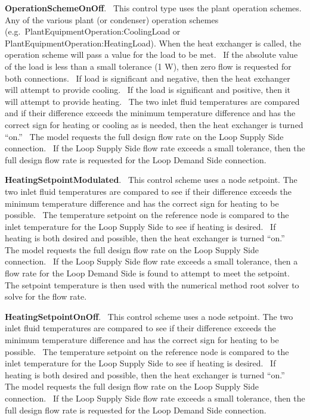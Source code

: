 \textbf{OperationSchemeOnOff}.~ This control type uses the plant operation schemes. Any of the various plant (or condenser) operation schemes (e.g.~PlantEquipmentOperation:CoolingLoad or PlantEquipmentOperation:HeatingLoad). When the heat exchanger is called, the operation scheme will pass a value for the load to be met.~ If the absolute value of the load is less than a small tolerance (1 W), then zero flow is requested for both connections.~ If load is significant and negative, then the heat exchanger will attempt to provide cooling.~ If the load is significant and positive, then it will attempt to provide heating.~ The two inlet fluid temperatures are compared and if their difference exceeds the minimum temperature difference and has the correct sign for heating or cooling as is needed, then the heat exchanger is turned ``on.''~ The model requests the full design flow rate on the Loop Supply Side connection.~ If the Loop Supply Side flow rate exceeds a small tolerance, then the full design flow rate is requested for the Loop Demand Side connection.

\textbf{HeatingSetpointModulated}.~ This control scheme uses a node setpoint. The two inlet fluid temperatures are compared to see if their difference exceeds the minimum temperature difference and has the correct sign for heating to be possible.~ The temperature setpoint on the reference node is compared to the inlet temperature for the Loop Supply Side to see if heating is desired.~ If heating is both desired and possible, then the heat exchanger is turned ``on.''~ The model requests the full design flow rate on the Loop Supply Side connection.~ If the Loop Supply Side flow rate exceeds a small tolerance, then a flow rate for the Loop Demand Side is found to attempt to meet the setpoint.~ The setpoint temperature is then used with the numerical method root solver to solve for the flow rate.

\textbf{HeatingSetpointOnOff}.~ This control scheme uses a node setpoint. The two inlet fluid temperatures are compared to see if their difference exceeds the minimum temperature difference and has the correct sign for heating to be possible.~ The temperature setpoint on the reference node is compared to the inlet temperature for the Loop Supply Side to see if heating is desired.~ If heating is both desired and possible, then the heat exchanger is turned ``on.''~ The model requests the full design flow rate on the Loop Supply Side connection.~ If the Loop Supply Side flow rate exceeds a small tolerance, then the full design flow rate is requested for the Loop Demand Side connection.

